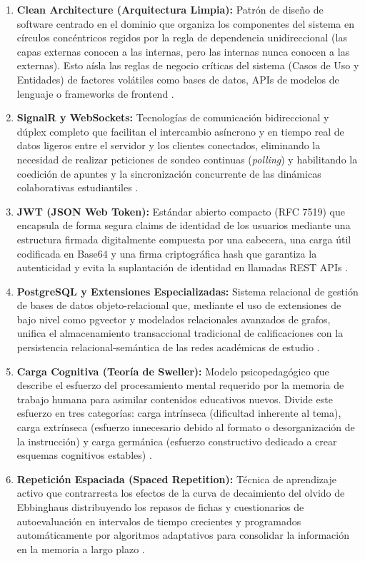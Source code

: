\begin{enumerate}[label=\alph*), leftmargin=*]
  \item \textbf{Clean Architecture (Arquitectura Limpia):} Patrón de diseño de software centrado en el dominio que organiza los componentes del sistema en círculos concéntricos regidos por la regla de dependencia unidireccional (las capas externas conocen a las internas, pero las internas nunca conocen a las externas). Esto aísla las reglas de negocio críticas del sistema (Casos de Uso y Entidades) de factores volátiles como bases de datos, APIs de modelos de lenguaje o frameworks de frontend \parencite{Martin2017}.

  \item \textbf{SignalR y WebSockets:} Tecnologías de comunicación bidireccional y dúplex completo que facilitan el intercambio asíncrono y en tiempo real de datos ligeros entre el servidor y los clientes conectados, eliminando la necesidad de realizar peticiones de sondeo continuas (\textit{polling}) y habilitando la coedición de apuntes y la sincronización concurrente de las dinámicas colaborativas estudiantiles \parencite{Shirkande2025}.

  \item \textbf{JWT (JSON Web Token):} Estándar abierto compacto (RFC 7519) que encapsula de forma segura claims de identidad de los usuarios mediante una estructura firmada digitalmente compuesta por una cabecera, una carga útil codificada en Base64 y una firma criptográfica hash que garantiza la autenticidad y evita la suplantación de identidad en llamadas REST APIs \parencite{Jones2015}.

  \item \textbf{PostgreSQL y Extensiones Especializadas:} Sistema relacional de gestión de bases de datos objeto-relacional que, mediante el uso de extensiones de bajo nivel como pgvector y modelados relacionales avanzados de grafos, unifica el almacenamiento transaccional tradicional de calificaciones con la persistencia relacional-semántica de las redes académicas de estudio \parencite{Upadhyay2026}.

  \item \textbf{Carga Cognitiva (Teoría de Sweller):} Modelo psicopedagógico que describe el esfuerzo del procesamiento mental requerido por la memoria de trabajo humana para asimilar contenidos educativos nuevos. Divide este esfuerzo en tres categorías: carga intrínseca (dificultad inherente al tema), carga extrínseca (esfuerzo innecesario debido al formato o desorganización de la instrucción) y carga germánica (esfuerzo constructivo dedicado a crear esquemas cognitivos estables) \parencite{HartStaveland1988}.

  \item \textbf{Repetición Espaciada (Spaced Repetition):} Técnica de aprendizaje activo que contrarresta los efectos de la curva de decaimiento del olvido de Ebbinghaus distribuyendo los repasos de fichas y cuestionarios de autoevaluación en intervalos de tiempo crecientes y programados automáticamente por algoritmos adaptativos para consolidar la información en la memoria a largo plazo \parencite{Kreijkes2026}.
\end{enumerate}